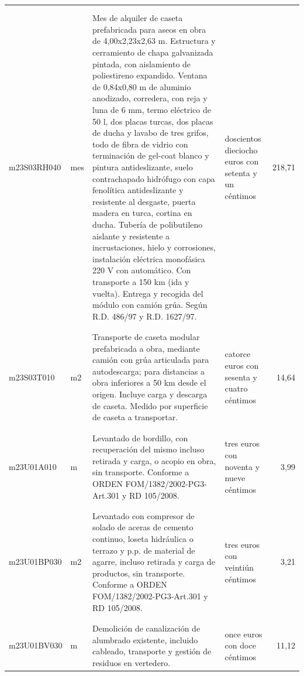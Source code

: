 \documentclass{book}%
\begin{document}
\begin{longtable}{|l|l|p{5cm}|p{3cm}|r|}
&&&&\\%
&&&&\\%
m23S03RH040&mes&Mes de alquiler de caseta prefabricada para aseos en obra de 4,00x2,23x2,63 m. Estructura y cerramiento de chapa galvanizada pintada, con aislamiento de poliestireno expandido. Ventana de 0,84x0,80 m de aluminio anodizado, corredera, con reja y luna de 6 mm, termo eléctrico de 50 l, dos placas turcas, dos placas de ducha y lavabo de tres grifos, todo de fibra de vidrio con terminación de gel{-}coat blanco y pintura antideslizante, suelo contrachapado hidrófugo con capa fenolítica antideslizante y resistente al desgaste, puerta madera en turca, cortina en ducha. Tubería de polibutileno aislante y resistente a incrustaciones, hielo y corrosiones, instalación eléctrica monofásica 220 V con automático. Con transporte a 150 km (ida y vuelta). Entrega y recogida del módulo con camión grúa. Según R.D. 486/97 y R.D. 1627/97.&doscientos dieciocho euros con setenta y un céntimos&218,71\\%
&&&&\\%
&&&&\\%
m23S03T010&m2&Transporte de caseta modular prefabricada a obra, mediante camión con grúa articulada para autodescarga; para distancias a obra inferiores a 50 km desde el origen. Incluye carga y descarga de caseta. Medido por superficie de caseta a transportar.&catorce euros con sesenta y cuatro céntimos&14,64\\%
&&&&\\%
&&&&\\%
m23U01A010&m&Levantado de bordillo, con recuperación del mismo incluso retirada y carga, o acopio en obra, sin transporte. Conforme a ORDEN FOM/1382/2002{-}PG3{-}Art.301 y RD 105/2008.&tres euros con noventa y nueve céntimos&3,99\\%
&&&&\\%
&&&&\\%
m23U01BP030&m2&Levantado con compresor de solado de aceras de cemento continuo, loseta hidráulica o terrazo y p.p. de material de agarre, incluso retirada y carga de productos, sin transporte. Conforme a ORDEN FOM/1382/2002{-}PG3{-}Art.301 y RD 105/2008.&tres euros con veintiún céntimos&3,21\\%
&&&&\\%
&&&&\\%
m23U01BV030&m&Demolición de canalización de alumbrado existente, incluido cableado, transporte y gestión de residuos en vertedero.&once euros con doce céntimos&11,12\\%

\end{longtable}
\end{document}
